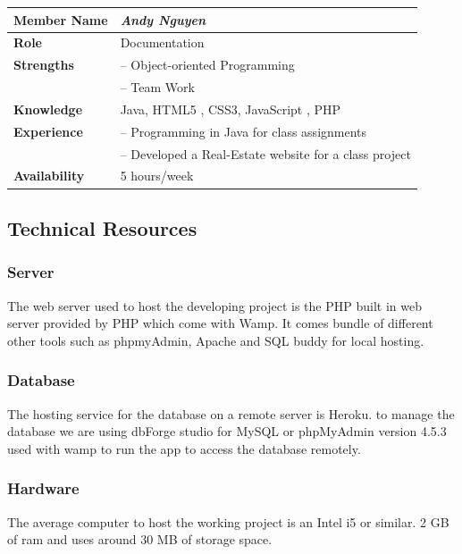 \documentclass[12pt]{article}
\begin{document}
%
\vspace{3mm}
%
\begin{center}
\begin{tabular}{ p{2.7cm} | p{9cm} }
\hline
\textbf{Member Name}	&	\textit{\textbf{Andy Nguyen}}	\\ \hline \hline
\textbf{Role}		&	Documentation	\\ \hline
\textbf{Strengths}	&	-- Object-oriented Programming	\\
			&	-- Team Work	\\ \hline
\textbf{Knowledge}	&	Java, HTML5 , CSS3, JavaScript , PHP	\\ \hline
\textbf{Experience}	&	-- Programming in Java for class assignments	\\
			&	-- Developed a Real-Estate website for a class project	\\ \hline
\textbf{Availability}	&	5 hours/week	\\ \hline
\end{tabular}
\end{center}
%
\vspace{3mm}
%
\subsection{Technical Resources}

\subsubsection{Server}

The web server used to host the developing project is the PHP built in web server provided by PHP which come with Wamp. It comes bundle of different other tools such as phpmyAdmin, Apache and SQL buddy for local hosting.
\subsubsection{Database}

 The hosting service for the database on a remote server is Heroku. to manage the database we are using dbForge studio for MySQL or phpMyAdmin version 4.5.3 used with wamp to run the app to access the database remotely.

\subsubsection{Hardware}

 The average computer to host the working project is an Intel i5 or similar. 2 GB of ram and uses around 30 MB of storage space. 
\end{document}
